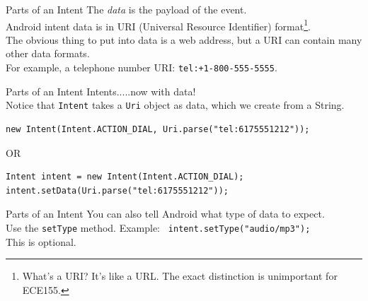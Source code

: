 \documentclass[aspectratio=169]{beamer}
\begin{document}
\begin{frame}{Parts of an Intent}
\large
The \emph{data} is the payload of the event. \\
\vspace{1em}
Android intent data is in
URI (Universal Resource Identifier) format\footnote{What's a URI? It's
like a URL. The exact distinction is unimportant for ECE155.}.  \\
\vspace{1em}
The obvious thing to put into data is a web address, but a URI can contain many other data formats. \\
\vspace{1em}
For example, a telephone number URI: \texttt{tel:+1-800-555-5555}.
\end{frame}



\begin{frame}[fragile]{Parts of an Intent}
\large
Intents.....now with data!\\
\vspace{1em}
Notice that \texttt{Intent} takes a \texttt{Uri} object as data, which we create from a String. \\
\vspace{2em}
\begin{Verbatim}[fontsize=\normalsize]
new Intent(Intent.ACTION_DIAL, Uri.parse("tel:6175551212"));
\end{Verbatim}
OR \\
\begin{Verbatim}
Intent intent = new Intent(Intent.ACTION_DIAL);
intent.setData(Uri.parse("tel:6175551212"));
\end{Verbatim}
\end{frame}



\begin{frame}{Parts of an Intent}
\Large
You can also tell Android what type of data to expect. \\
\vspace{1em}
Use the {\tt setType} method. Example: {\tt
  intent.setType("audio/mp3");} \\
\vspace{1em}
This is optional. 
\end{frame}
\end{document}
